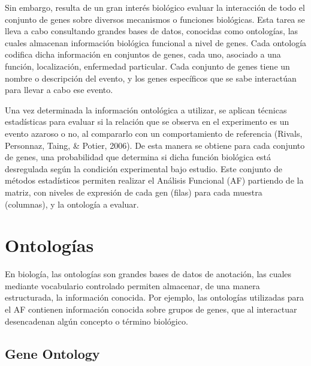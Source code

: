 \documentclass[12pt,twoside]{reedthesis}
\begin{document}
\par

Sin embargo, resulta de un gran interés biológico evaluar la interacción de todo el conjunto de genes sobre diversos mecanismos o funciones biológicas. Esta tarea se lleva a cabo consultando grandes bases de datos, conocidas como ontologías, las cuales almacenan información biológica funcional a nivel de genes. Cada ontología codifica dicha información en conjuntos de genes, cada uno, asociado a una función, localización, enfermedad particular. Cada conjunto de genes tiene un nombre o descripción del evento, y los genes específicos que se sabe interactúan para llevar a cabo ese evento.

\par

Una vez determinada la información ontológica a utilizar, se aplican técnicas estadísticas para evaluar si la relación que se observa en el experimento es un evento azaroso o no, al compararlo con un comportamiento de referencia (Rivals, Personnaz, Taing, \& Potier, 2006). De esta manera se obtiene para cada conjunto de genes, una probabilidad que determina si dicha función biológica está desregulada según la condición experimental bajo estudio. Este conjunto de métodos estadísticos permiten realizar el Análisis Funcional (AF) partiendo de la matriz, con niveles de expresión de cada gen (filas) para cada muestra (columnas), y la ontología a evaluar.

\hypertarget{sec:ontologias}{%
\section{Ontologías}\label{sec:ontologias}}

En biología, las ontologías son grandes bases de datos de anotación, las cuales mediante vocabulario controlado permiten almacenar, de una manera estructurada, la información conocida. Por ejemplo, las ontologías utilizadas para el AF contienen información conocida sobre grupos de genes, que al interactuar desencadenan algún concepto o término biológico.

\hypertarget{gene-ontology}{%
\subsection{Gene Ontology}\label{gene-ontology}}
\end{document}
